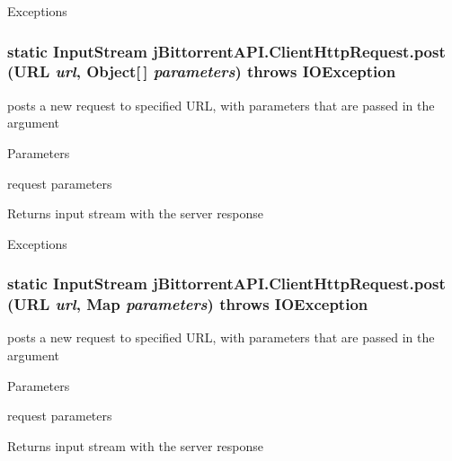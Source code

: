 \begin{DoxyExceptions}{Exceptions}
\item[{\em IOException}]\end{DoxyExceptions}
\hypertarget{classj_bittorrent_a_p_i_1_1_client_http_request_a7e1e5a95d7e6ae3c4427a95cde28fd91}{
\subsubsection[{post}]{\setlength{\rightskip}{0pt plus 5cm}static InputStream jBittorrentAPI.ClientHttpRequest.post (URL {\em url}, \/  Object\mbox{[}$\,$\mbox{]} {\em parameters})  throws IOException }}
\label{classj_bittorrent_a_p_i_1_1_client_http_request_a7e1e5a95d7e6ae3c4427a95cde28fd91}
posts a new request to specified URL, with parameters that are passed in the argument 
\begin{DoxyParams}{Parameters}
\item[{\em parameters}]request parameters \end{DoxyParams}
\begin{DoxyReturn}{Returns}
input stream with the server response 
\end{DoxyReturn}

\begin{DoxyExceptions}{Exceptions}
\item[{\em IOException}]\end{DoxyExceptions}
\hypertarget{classj_bittorrent_a_p_i_1_1_client_http_request_a21230c47f8549b6a6030ad5a0c8ce65b}{
\subsubsection[{post}]{\setlength{\rightskip}{0pt plus 5cm}static InputStream jBittorrentAPI.ClientHttpRequest.post (URL {\em url}, \/  Map {\em parameters})  throws IOException }}
\label{classj_bittorrent_a_p_i_1_1_client_http_request_a21230c47f8549b6a6030ad5a0c8ce65b}
posts a new request to specified URL, with parameters that are passed in the argument 
\begin{DoxyParams}{Parameters}
\item[{\em parameters}]request parameters \end{DoxyParams}
\begin{DoxyReturn}{Returns}
input stream with the server response 
\end{DoxyReturn}

